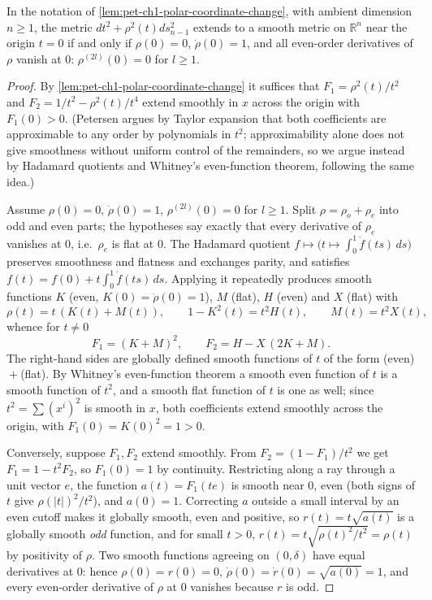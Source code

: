 \begin{theorem}
  \label{thm:pet-ch1-smoothness-criterion}
  \leanok
  In the notation of \cref{lem:pet-ch1-polar-coordinate-change}, with ambient
  dimension $n\ge1$, the metric
  $dt^2+\rho^2(t)ds_{n-1}^2$ extends to a smooth metric on $\mathbb{R}^n$ near the origin
  $t=0$ if and only if $\rho(0)=0$, $\dot\rho(0)=1$, and all even-order
  derivatives of $\rho$ vanish at $0$: $\rho^{(2l)}(0)=0$ for $l\ge1$.
\end{theorem}
\begin{proof}
  \leanok
  By \cref{lem:pet-ch1-polar-coordinate-change} it suffices that
  $F_1=\rho^2(t)/t^2$ and $F_2=1/t^2-\rho^2(t)/t^4$ extend smoothly in $x$
  across the origin with $F_1(0)>0$. (Petersen argues by Taylor expansion
  that both coefficients are approximable to any order by polynomials in
  $t^2$; approximability alone does not give smoothness without uniform
  control of the remainders, so we argue instead by Hadamard quotients and
  Whitney's even-function theorem, following the same idea.)

  Assume $\rho(0)=0$, $\dot\rho(0)=1$, $\rho^{(2l)}(0)=0$ for $l\ge1$. Split
  $\rho=\rho_o+\rho_e$ into odd and even parts; the hypotheses say exactly
  that every derivative of $\rho_e$ vanishes at $0$, i.e.\ $\rho_e$ is flat
  at $0$. The Hadamard quotient $f\mapsto\big(t\mapsto\int_0^1\dot
  f(ts)\,ds\big)$ preserves smoothness and flatness and exchanges parity,
  and satisfies $f(t)=f(0)+t\int_0^1\dot f(ts)\,ds$. Applying it repeatedly
  produces smooth functions $K$ (even, $K(0)=\dot\rho(0)=1$), $M$ (flat),
  $H$ (even) and $X$ (flat) with
  \[
    \rho(t)=t\,(K(t)+M(t)),\qquad 1-K^2(t)=t^2H(t),\qquad M(t)=t^2X(t),
  \]
  whence for $t\ne0$
  \[
    F_1=(K+M)^2,\qquad F_2=H-X\,(2K+M).
  \]
  The right-hand sides are globally defined smooth functions of $t$ of the
  form (even)${}+{}$(flat). By Whitney's even-function theorem a smooth even
  function of $t$ is a smooth function of $t^2$, and a smooth flat function
  of $t$ is one as well; since $t^2=\sum(x^i)^2$ is smooth in $x$, both
  coefficients extend smoothly across the origin, with
  $F_1(0)=K(0)^2=1>0$.

  Conversely, suppose $F_1,F_2$ extend smoothly. From
  $F_2=(1-F_1)/t^2$ we get $F_1=1-t^2F_2$, so $F_1(0)=1$ by continuity.
  Restricting along a ray through a unit vector $e$, the function
  $a(t)=F_1(te)$ is smooth near $0$, even (both signs of $t$ give
  $\rho(|t|)^2/t^2$), and $a(0)=1$. Correcting $a$ outside a small interval
  by an even cutoff makes it globally smooth, even and positive, so
  $r(t)=t\sqrt{a(t)}$ is a globally smooth \emph{odd} function, and for
  small $t>0$, $r(t)=t\sqrt{\rho(t)^2/t^2}=\rho(t)$ by positivity of
  $\rho$. Two smooth functions agreeing on $(0,\delta)$ have equal
  derivatives at $0$: hence $\rho(0)=r(0)=0$,
  $\dot\rho(0)=\dot r(0)=\sqrt{a(0)}=1$, and every even-order derivative of
  $\rho$ at $0$ vanishes because $r$ is odd.
\end{proof}

